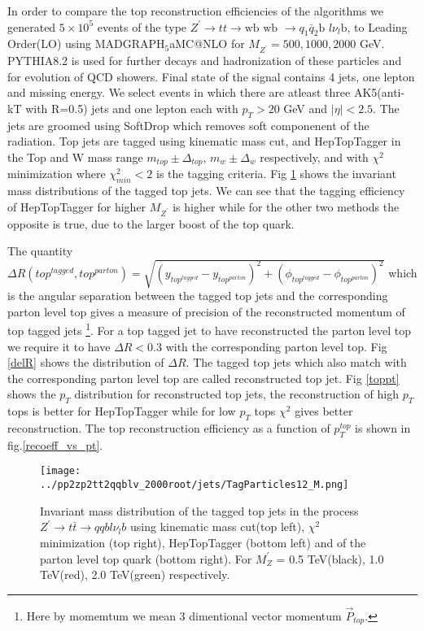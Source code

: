 \documentclass[12pt,a4paper]{article}		%
\begin{document}
In order to compare the top reconstruction efficiencies of the algorithms we generated $5 \times 10^5$ events of the type  $Z^\prime \to t t \to \text{wb wb } \to q_1 \bar{q}_2\text{b }l \nu_l\text{b}$, to Leading Order(LO) using $\text{MADGRAPH}_5$aMC@NLO \cite{mad1,mad2} for $M_{Z^\prime} = 500,1000,2000$ GeV. PYTHIA8.2 \cite{pythia} is used for further decays and hadronization  of these particles and for evolution of QCD showers. Final state of the signal contains 4 jets, one lepton and missing energy. We select events in which there are atleast three AK5(anti-kT with R=0.5) jets and one lepton each with $p_T > 20$ GeV and $|\eta| < 2.5$. The jets are groomed using SoftDrop\cite{softdrop} which removes soft componenent of the radiation. Top jets are tagged using kinematic mass cut, and HepTopTagger in the Top and W mass range $m_{top} \pm \Delta_{top}$, $m_{w} \pm \Delta_{w}$ respectively, and with $\chi^2$ minimization where $\chi_{min}^2 < 2$ is the tagging criteria. Fig \ref{topm} shows the invariant mass distributions of the tagged top jets. We can see that the tagging efficiency of HepTopTagger for higher $M_{Z^\prime}$ is higher while for the other two methods the opposite is true, due to the larger boost of the top quark.\\
\linebreak

The quantity $\Delta R( top^{tagged}, top^{parton} ) =  \sqrt{ \left(  y_{top^{tagged}} - y_{top^{parton}} \right) ^2 +  \left( \phi_{top^{tagged}} - \phi_{top^{parton}} \right) ^2 }$ which is the angular separation between the tagged top jets and the corresponding parton level top gives a measure of precision of the reconstructed momentum of top tagged jets \footnote{Here by momemtum we mean 3 dimentional vector momentum $\vec{P}_{top}$.  }. For a top tagged jet to have reconstructed the parton level top we require it to have $\Delta R < 0.3$ with the corresponding parton level top. Fig \ref{delR} shows the distribution of $\Delta R$. The tagged top jets which also match with the corresponding parton level top are called reconstructed top jet. Fig \ref{toppt} shows the $p_T$ distribution for reconstructed top jets, the reconstruction of high $p_T$ tops is better for HepTopTagger while for low $p_T$ tops $\chi^2$ gives better reconstruction. The top reconstruction efficiency as a function of $p_T^{top}$ is shown in fig.\ref{recoeff_vs_pt}.       
 

\newpage 

\begin{figure}[h]
	\begin{centering}	
		\texttt{[image: ../pp2zp2tt2qqblv\_2000root/jets/TagParticles12\_M.png]} 
		\caption{ Invariant mass distribution of the tagged top jets in the process  $Z^\prime \to t \bar{t} \to qqbl\nu_{l}b$ using kinematic mass cut(top left), $\chi^2$ minimization (top right), HepTopTagger (bottom left) and of the parton level top quark (bottom right). For $M_Z^\prime$ = 0.5 TeV(black), 1.0 TeV(red), 2.0 TeV(green)  respectively. }
		\label{topm}
		\centering
	\end{centering} 		
\end{figure}
\end{document}

